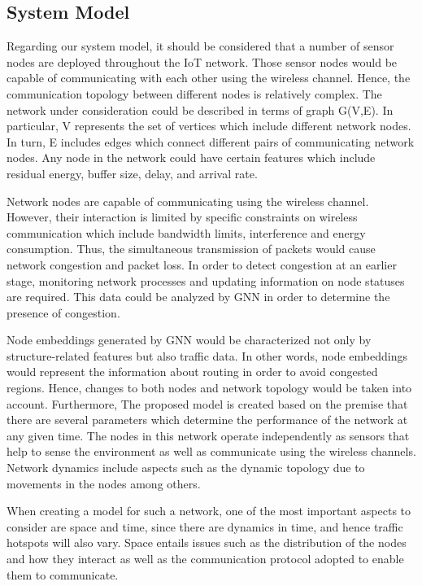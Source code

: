 \documentclass[a4paper,fleqn]{cas-dc}
\numberwithin{equation}{section}
\begin{document}
\subsection{System Model}
Regarding our system model, it should be considered that a number of sensor nodes are deployed throughout the IoT network. Those sensor nodes would be capable of communicating with each other using the wireless channel. Hence, the communication topology between different nodes is relatively complex. The network under consideration could be described in terms of graph G(V,E). In particular, V represents the set of vertices which include different network nodes. In turn, E includes edges which connect different pairs of communicating network nodes. Any node in the network could have certain features which include residual energy, buffer size, delay, and arrival rate.

Network nodes are capable of communicating using the wireless channel. However, their interaction is limited by specific constraints on wireless communication which include bandwidth limits, interference and energy consumption. Thus, the simultaneous transmission of packets would cause network congestion and packet loss. In order to detect congestion at an earlier stage, monitoring network processes and updating information on node statuses are required. This data could be analyzed by GNN in order to determine the presence of congestion.

Node embeddings generated by GNN would be characterized not only by structure-related features but also traffic data. In other words, node embeddings would represent the information about routing in order to avoid congested regions. Hence, changes to both nodes and network topology would be taken into account.
Furthermore, The proposed model is created based on the premise that there are several parameters which determine the performance of the network at any given time. The nodes in this network operate independently as sensors that help to sense the environment as well as communicate using the wireless channels. Network dynamics include aspects such as the dynamic topology due to movements in the nodes among others.

When creating a model for such a network, one of the most important aspects to consider are space and time, since there are dynamics in time, and hence traffic hotspots will also vary. Space entails issues such as the distribution of the nodes and how they interact as well as the communication protocol adopted to enable them to communicate.
\end{document}
